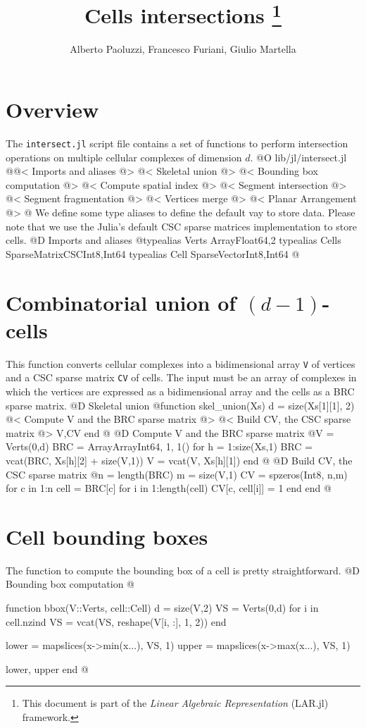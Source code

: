 \documentclass[10pt,oneside]{article}
\author{Alberto Paoluzzi, Francesco Furiani, Giulio Martella}
\title{Cells intersections
\footnote{This document is part of the \emph{Linear Algebraic Representation} (LAR.jl) framework.}
}
\begin{document}
\maketitle
\newpage

\section{Overview}
The \texttt{intersect.jl} script file contains a set of functions to perform intersection
operations on multiple cellular complexes of dimension $d$.
@O lib/jl/intersect.jl
@{@< Imports and aliases @>
@< Skeletal union @>
@< Bounding box computation @>
@< Compute spatial index @>
@< Segment intersection @>
@< Segment fragmentation @>
@< Vertices merge @>
@< Planar Arrangement @>
@}
We define some type aliases to define the default vay to store data.
Please note that we use the Julia's default CSC sparse matrices implementation
to store cells.
@D Imports and aliases
@{typealias Verts Array{Float64,2}
typealias Cells SparseMatrixCSC{Int8,Int64}
typealias Cell SparseVector{Int8,Int64}
@}

\section{Combinatorial union of $(d-1)$-cells}
This function converts cellular complexes into a bidimensional array \texttt{V} of 
vertices and a CSC sparse matrix \texttt{CV} of cells. The input must be an array of complexes
in which the vertices are expressed as a bidimensional array and the cells as a BRC
sparse matrix.
@D Skeletal union
@{function skel_union(Xs)
    d = size(Xs[1][1], 2)
    @< Compute V and the BRC sparse matrix @>
    @< Build CV, the CSC sparse matrix @>
    V,CV
end
@}
@D Compute V and the BRC sparse matrix
@{V = Verts(0,d)
BRC = Array{Array{Int64, 1}, 1}()
for h = 1:size(Xs,1)
    BRC = vcat(BRC, Xs[h][2] + size(V,1))
    V = vcat(V, Xs[h][1])
end
@}
@D Build CV, the CSC sparse matrix
@{n = length(BRC)
m = size(V,1)
CV = spzeros(Int8, n,m)
for c in 1:n
    cell = BRC[c]
    for i in 1:length(cell)
        CV[c, cell[i]] = 1
    end
end
@}


\section{Cell bounding boxes}
The function to compute the bounding box of a cell
is pretty straightforward.
@D Bounding box computation
@{function bbox(V::Verts, cell::Cell)
    d = size(V,2)
    VS = Verts(0,d)
    for i in cell.nzind
        VS = vcat(VS, reshape(V[i, :], 1, 2))
    end
    
    lower = mapslices(x->min(x...), VS, 1)
    upper = mapslices(x->max(x...), VS, 1)
    
    lower, upper
end
@}
\end{document}
